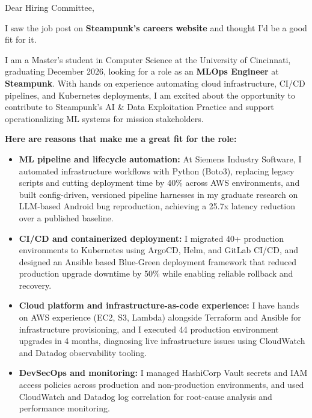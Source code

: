 \documentclass[11pt]{letter}
\date{}
\begin{document}
\begin{letter}{}

\opening{Dear Hiring Committee,}

I saw the job post on \textbf{Steampunk's careers website} and thought I'd be a good fit for it.

I am a Master's student in Computer Science at the University of Cincinnati, graduating December 2026, looking for a role as an \textbf{MLOps Engineer} at \textbf{Steampunk}. With hands on experience automating cloud infrastructure, CI/CD pipelines, and Kubernetes deployments, I am excited about the opportunity to contribute to Steampunk's AI \& Data Exploitation Practice and support operationalizing ML systems for mission stakeholders.

\textbf{Here are reasons that make me a great fit for the role:}

\begin{itemize}[leftmargin=*, itemsep=0.45em]
    \item \textbf{ML pipeline and lifecycle automation:} At Siemens Industry Software, I automated infrastructure workflows with Python (Boto3), replacing legacy scripts and cutting deployment time by 40\% across AWS environments, and built config-driven, versioned pipeline harnesses in my graduate research on LLM-based Android bug reproduction, achieving a 25.7x latency reduction over a published baseline.

    \item \textbf{CI/CD and containerized deployment:} I migrated 40+ production environments to Kubernetes using ArgoCD, Helm, and GitLab CI/CD, and designed an Ansible based Blue-Green deployment framework that reduced production upgrade downtime by 50\% while enabling reliable rollback and recovery.

    \item \textbf{Cloud platform and infrastructure-as-code experience:} I have hands on AWS experience (EC2, S3, Lambda) alongside Terraform and Ansible for infrastructure provisioning, and I executed 44 production environment upgrades in 4 months, diagnosing live infrastructure issues using CloudWatch and Datadog observability tooling.

    \item \textbf{DevSecOps and monitoring:} I managed HashiCorp Vault secrets and IAM access policies across production and non-production environments, and used CloudWatch and Datadog log correlation for root-cause analysis and performance monitoring.


\end{itemize}
\end{letter}
\end{document}
